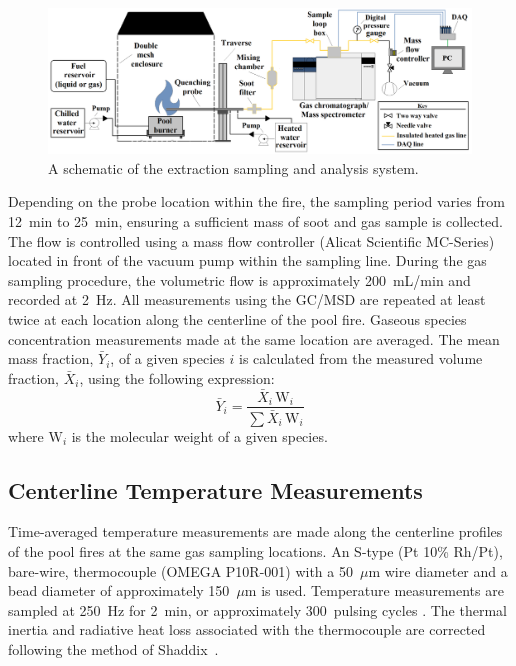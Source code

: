 \documentclass[preprint,review,12pt]{elsarticle}
\begin{document}
\begin{figure}[!t]
	\centering
\includegraphics[width=14.2 cm,keepaspectratio]{Experimental_Setup.png}
	\caption[A schematic of the gas sampling procedure]{A schematic of the extraction sampling and analysis system.}
	\label{fig:Experimental_Setup}
\end{figure}
Depending on the probe location within the fire, the sampling period varies from \SI{12}{min} to \SI{25}{min}, ensuring a sufficient mass of soot and gas sample is collected. The flow is controlled using a mass flow controller (Alicat Scientific MC-Series) located in front of the vacuum pump within the sampling line. During the gas sampling procedure, the volumetric flow is approximately 200~mL/min and recorded at \SI{2}{\hertz}. All measurements using the GC/MSD are repeated at least twice at each location along the centerline of the pool fire. Gaseous species concentration measurements made at the same location are averaged. The mean mass fraction, $\bar{Y}_{i}$, of a given species $i$ is calculated from the measured volume fraction, $\bar{X}_{i}$, using the following expression:
\begin{equation}\label{eq:mass_fraction}
	\bar{Y}_{i}=\frac{\bar{X}_{i} \, {\textrm{W}_{i}}}{\sum{\bar{X}_{i} \, {\textrm{W}_{i}}}}
\end{equation}
where ${{\textrm{W}_{i}}}$ is the molecular weight of a given species.

\subsection{Centerline Temperature Measurements}
\label{ssec:Temperature_Measurements}
Time-averaged temperature measurements are made along the centerline profiles of the pool fires at the same gas sampling locations. An S-type (Pt 10\% Rh/Pt), bare-wire, thermocouple (OMEGA P10R-001) with a 50~$\mu$m wire diameter and a bead diameter of approximately 150~$\mu$m is used. Temperature measurements are sampled at \SI{250}{Hz} for \SI{2}{min}, or approximately 300~pulsing cycles \cite{Wang2019}. The thermal inertia and radiative heat loss associated with the thermocouple are corrected following the method of Shaddix~\cite{Shaddix1999}.
\end{document}
